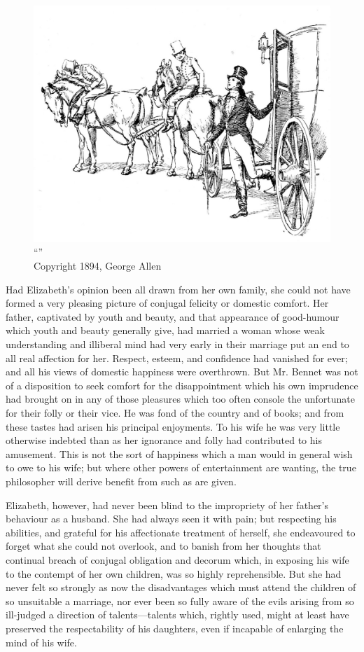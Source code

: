 \begin{figure}[htbp]
    \centering
    \includegraphics[width=\textwidth]{illustrations/i_031.jpg}
    \caption{“”\\ Copyright 1894, George Allen}
    \label{fig:image}
\end{figure}


Had Elizabeth's opinion been all drawn from her own family, she could not have formed a very pleasing picture of conjugal felicity or domestic comfort. Her father, captivated by youth and beauty, and that appearance of good-humour which youth and beauty generally give, had married a woman whose weak understanding and illiberal mind had very early in their marriage put an end to all real affection for her. Respect, esteem, and confidence had vanished for ever; and all his views of domestic happiness were overthrown. But Mr. Bennet was not of a disposition to seek comfort for the disappointment which his own imprudence had brought on in any of those pleasures which too often console the unfortunate for their folly or their vice. He was fond of the country and of books; and from these tastes had arisen his principal enjoyments. To his wife he was very little otherwise indebted than as her ignorance and folly had contributed to his amusement. This is not the sort of happiness which a man would in general wish to owe to his wife; but where other powers of entertainment are wanting, the true philosopher will derive benefit from such as are given.

Elizabeth, however, had never been blind to the impropriety of her father's behaviour as a husband. She had always seen it with pain; but respecting his abilities, and grateful for his affectionate treatment of herself, she endeavoured to forget what she could not overlook, and to banish from her thoughts that continual breach of conjugal obligation and decorum which, in exposing his wife to the contempt of her own children, was so highly reprehensible. But she had never felt so strongly as now the disadvantages which must attend the children of so unsuitable a marriage, nor ever been so fully aware of the evils arising from so ill-judged a direction of talents---talents which, rightly used, might at least have preserved the respectability of his daughters, even if incapable of enlarging the mind of his wife.

